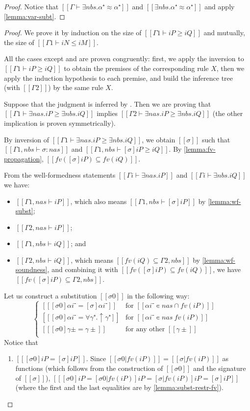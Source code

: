 \corollaryVarsNoProperSubtypes*
\begin{proof}
  Notice that $[[Γ ⊢ ∃nbs.α⁺ ≈ α⁺]]$ and $[[∃nbs.α⁺ ≈ α⁺]]$ and apply
  \cref{lemma:var-subt}.
\end{proof}


\lemmaSubtCtxtIrrelevance*
\begin{proof}
  We prove it by induction on 
  the size of $[[Γ1 ⊢ iP ≥ iQ]]$ and mutually,
  the size of $[[Γ1 ⊢ iN ≤ iM]]$.

  All the cases except  and 
  are proven congruently:
  first, we apply the inversion to $[[Γ1 ⊢ iP ≥ iQ]]$ to obtain the premises of the
  corresponding rule $X$, then we apply the induction hypothesis to each premise,
  and build the inference tree (with $[[Γ2]]$) by the same rule $X$. 

  Suppose that the judgment is inferred by .
  Then we are proving that $[[Γ1 ⊢ ∃nas.iP ≥ ∃nbs.iQ]]$ implies 
  $[[Γ2 ⊢ ∃nas.iP ≥ ∃nbs.iQ]]$ (the other implication is proven symmetrically).

  By inversion  of $[[Γ1 ⊢ ∃nas.iP ≥ ∃nbs.iQ]]$, 
  we obtain $[[σ]]$ such that $[[ Γ1, nbs ⊢ σ :{nas}]]$
  and $[[Γ1, nbs ⊢ [σ]iP ≥ iQ]]$.
  By \cref{lemma:fv-propagation}, $[[fv([σ]iP) ⊆ fv(iQ)]]$.

  From the well-formedness statements 
  $[[Γi ⊢ ∃nas.iP]]$ and $[[Γi ⊢ ∃nbs.iQ]]$ we have:
  \begin{itemize}
    \item $[[Γ1, nas ⊢ iP]]$, which also means $[[Γ1, nbs ⊢ [σ]iP]]$
      by \cref{lemma:wf-subst};
    \item $[[Γ2, nas ⊢ iP]]$;
    \item $[[Γ1, nbs ⊢ iQ]]$; and 
    \item $[[Γ2, nbs ⊢ iQ]]$, which means $[[ fv(iQ) ⊆ Γ2, nbs ]]$
      by \cref{lemma:wf-soundness},
      and  combining it with $[[fv([σ]iP) ⊆ fv(iQ)]]$, 
      we have $[[fv([σ]iP) ⊆ Γ2, nbs]]$.
  \end{itemize}

  Let us construct a substitution $[[σ0]]$ in the following way:
  $$
  \begin{cases}
      [[ [σ0]αi⁻ = [σ]αi⁻  ]] & \text{for $[[αi⁻ ∊ {nas} ∩ fv(iP)]]$ }\\
      [[ [σ0]αi⁻ = ∀γ⁺.↑γ⁺ ]] & \text{for $[[αi⁻ ∊ {nas} \ fv(iP)]]$ }\\
      [[ [σ0]γ±  = γ± ]]      & \text{for any other $[[γ±]]$ }\\
  \end{cases}
  $$
  Notice that 
  \begin{enumerate}
    \item $[[ [σ0]iP = [σ]iP ]]$.
      Since $[[σ0|fv(iP)]] = [[σ|fv(iP)]]$ as functions
      (which follows from the construction of 
      $[[σ0]]$ and the signature of $[[σ]]$), 
      $[[ [σ0]iP = [σ0|fv(iP)]iP = [σ|fv(iP)]iP = [σ]iP]]$
      (where the first and the last equalities are by
       \cref{lemma:subst-restr-fv}).


\end{enumerate}
\end{proof}
